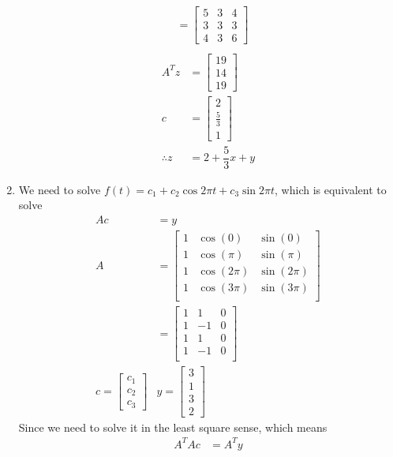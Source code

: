 \documentclass{article}
\begin{document}
\begin{enumerate}
\begin{align*}
&=\begin{bmatrix}
5&3&4\\3&3&3\\4&3&6
\end{bmatrix}\\
\end{align*}\begin{align*}
A^Tz&=\begin{bmatrix}
19\\14\\19
\end{bmatrix}\\
c &= \begin{bmatrix}
2\\\frac{5}{3}\\1
\end{bmatrix}\\
\therefore z&=2+\dfrac{5}{3}x+y
\end{align*}
\item
We need to solve $f(t) = c_1+c_2\cos 2\pi t+c_3\sin 2\pi t$, which is equivalent to solve \begin{align*}
Ac&=y\\
A &= \begin{bmatrix}
1&\cos(0)&\sin(0)\\
1&\cos(\pi)&\sin(\pi)\\
1&\cos(2\pi)&\sin(2\pi)\\
1&\cos(3\pi)&\sin(3\pi)\\
\end{bmatrix}\\
&=\begin{bmatrix}
1&1&0\\
1&-1&0\\
1&1&0\\
1&-1&0\\
\end{bmatrix}\\
c = \begin{bmatrix}
c_1\\c_2\\c_3
\end{bmatrix}&y =\begin{bmatrix}
3\\1\\3\\2
\end{bmatrix}
\end{align*}
Since we need to solve it in the least square sense, which means \begin{align*}
A^TAc&=A^Ty\\

\end{align*}
\end{enumerate}
\end{document}
